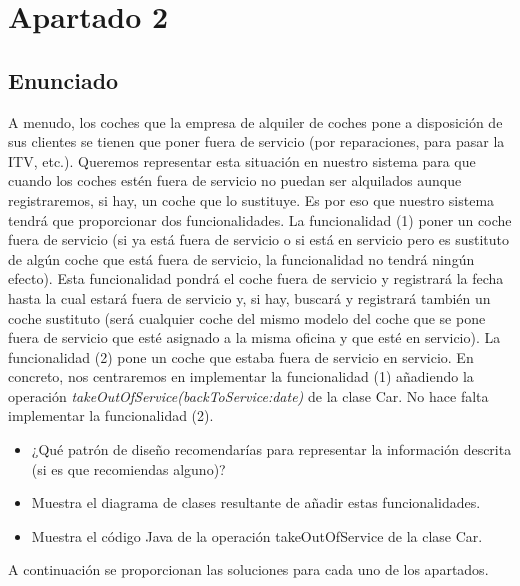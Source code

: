 \section{Apartado 2}
\subsection{Enunciado}
A menudo, los coches que la empresa de alquiler de coches pone a disposición de sus clientes se tienen que poner 
fuera de servicio (por reparaciones, para pasar la ITV, etc.). Queremos representar esta situación en nuestro sistema 
para que cuando los coches estén fuera de servicio no puedan ser alquilados aunque registraremos, si hay, un coche 
que lo sustituye. Es por eso que nuestro sistema tendrá que proporcionar dos funcionalidades. La funcionalidad (1) 
poner un coche fuera de servicio (si ya está fuera de servicio o si está en servicio pero es sustituto de algún coche 
que está fuera de servicio, la funcionalidad no tendrá ningún efecto). Esta funcionalidad pondrá el coche fuera de 
servicio y registrará la fecha hasta la cual estará fuera de servicio y, si hay, buscará y registrará también un coche 
sustituto (será cualquier coche del mismo modelo del coche que se pone fuera de servicio que esté asignado a la 
misma oficina y que esté en servicio). La funcionalidad (2) pone un coche que estaba fuera de servicio en servicio. 
En 
concreto, nos centraremos en implementar la funcionalidad (1) añadiendo la operación 
\textit{takeOutOfService(backToService:date)} de la clase Car. No hace falta implementar la funcionalidad (2). 

\begin{itemize}
\item ¿Qué patrón de diseño recomendarías para representar la información descrita (si es que recomiendas 
alguno)? 
\item Muestra el diagrama de clases resultante de añadir estas funcionalidades. 
\item Muestra el código Java de la operación takeOutOfService de la clase Car. 
\end{itemize}
\par
\vspace{0.15cm}
A continuación se proporcionan las soluciones para cada uno de los apartados.

